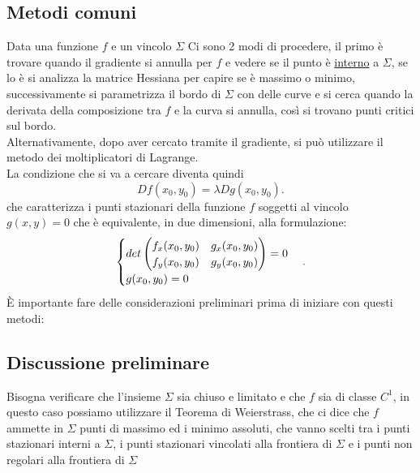 \documentclass[12px]{article}
\begin{document}
	\subsection{Metodi comuni}
	Data una funzione $f$ e un vincolo $\Sigma$ Ci sono 2 modi di procedere, il primo è trovare quando il gradiente si annulla per $f$ e vedere se il punto è \underline{interno} a $\Sigma$, se lo è si analizza la matrice Hessiana per capire se è massimo o minimo, successivamente si parametrizza il bordo di $\Sigma$ con delle curve e si cerca quando la derivata della composizione tra  $f$ e la curva si annulla, così si trovano punti critici sul bordo.\\
	Alternativamente, dopo aver cercato tramite il gradiente, si può utilizzare il metodo dei moltiplicatori di Lagrange.\\
	La condizione che si va a cercare diventa quindi
	\[
	Df(x_0,y_0) = \lambda Dg(x_0,y_0)
	.\] 
che caratterizza i punti  stazionari della funzione $f$ soggetti al vincolo $g(x,y) = 0$ che è equivalente, in due dimensioni, alla formulazione:
\[
	\begin{cases}
		
det \begin{pmatrix}
	f_x(x_0,y_0) & g_x (x_0,y_0)\\
f_y(x_0,y_0) & g_y (x_0,y_0)\end{pmatrix} = 0\\
g(x_0,y_0) = 0
	\end{cases}
.\] 
È importante fare delle considerazioni preliminari prima di iniziare con questi metodi:\\
\subsection{Discussione preliminare}
Bisogna verificare che l'insieme $\Sigma$ sia chiuso e limitato e che $f$ sia di classe $C^1$, in questo caso possiamo utilizzare il Teorema di Weierstrass, che ci dice che $f$ ammette in $\Sigma$ punti di massimo ed i minimo assoluti, che vanno scelti tra i punti stazionari interni a $\Sigma$, i punti stazionari vincolati alla frontiera di $\Sigma$ e i punti non regolari alla frontiera di  $\Sigma$
\end{document}
